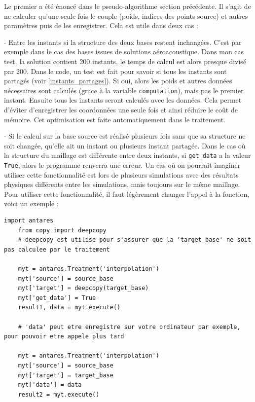 Le premier a été énoncé dans le pseudo-algorithme section précédente. Il s'agit de ne calculer qu'une seule fois le couple (poids, indices des points source) et autres paramètres puis de les enregistrer. Cela est utile dans deux cas :

- Entre les instants si la structure des deux bases restent inchangées.
C'est par exemple dans le cas des bases issues de solutions aéroacoustique. Dans mon cas test, la solution contient 200 instants, le temps de calcul est alors presque divisé par 200. Dans le code, un test est fait pour savoir si tous les instants sont partagés (voir \ref{instants_partages}). Si oui, alors les poids et autres données nécessaires sont calculés (grace à la variable \texttt{computation}), mais pas le premier instant. Ensuite tous les instants seront calculés avec les données. Cela permet d'éviter d'enregistrer les coordonnées une seule fois et ainsi réduire le coût de mémoire.
Cet optimisation est faite automatiquement dans le traitement.

- Si le calcul sur la base source est réalisé plusieurs fois sans que sa structure ne soit changée, qu'elle ait un instant ou plusieurs instant partagée. Dans le cas où la structure du maillage est différente entre deux instants, si \texttt{get\_data} a la valeur \texttt{True}, alors le programme renverra une erreur.
Un cas où on pourrait imaginer utiliser cette fonctionnalité est lors de plusieurs simulations avec des résultats physiques différents entre les simulations, mais toujours sur le même maillage. Pour utiliser cette fonctionnalité, il faut légèrement changer l'appel à la fonction, voici un exemple :

\begin{lstlisting}[caption=Exemple de réutilisation des données, label={lst:antares}]
    import antares
    from copy import deepcopy
    # deepcopy est utilise pour s'assurer que la 'target_base' ne soit pas calculee par le traitement

    myt = antares.Treatment('interpolation')
    myt['source'] = source_base
    myt['target'] = deepcopy(target_base)
    myt['get_data'] = True
    result1, data = myt.execute()

    # 'data' peut etre enregistre sur votre ordinateur par exemple, pour pouvoir etre appele plus tard

    myt = antares.Treatment('interpolation')
    myt['source'] = source_base
    myt['target'] = target_base
    myt['data'] = data
    result2 = myt.execute()
\end{lstlisting}

